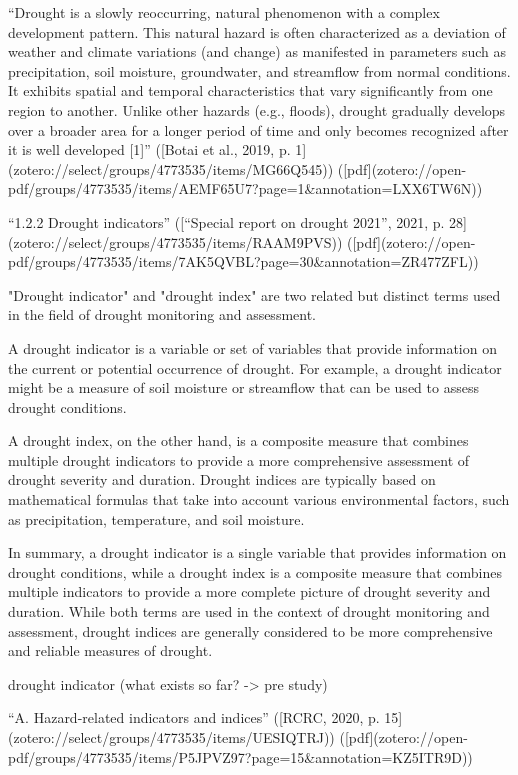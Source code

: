 {“Drought is a slowly reoccurring, natural phenomenon with a complex development pattern. This natural hazard is often characterized as a deviation of weather and climate variations (and change) as manifested in parameters such as precipitation, soil moisture, groundwater, and streamflow from normal conditions. It exhibits spatial and temporal characteristics that vary significantly from one region to another. Unlike other hazards (e.g., floods), drought gradually develops over a broader area for a longer period of time and only becomes recognized after it is well developed [1]” ([Botai et al., 2019, p. 1](zotero://select/groups/4773535/items/MG66Q545)) ([pdf](zotero://open-pdf/groups/4773535/items/AEMF65U7?page=1&annotation=LXX6TW6N))



“1.2.2 Drought indicators” ([“Special report on drought 2021”, 2021, p. 28](zotero://select/groups/4773535/items/RAAM9PVS)) ([pdf](zotero://open-pdf/groups/4773535/items/7AK5QVBL?page=30&annotation=ZR477ZFL))

"Drought indicator" and "drought index" are two related but distinct terms used in the field of drought monitoring and assessment.

A drought indicator is a variable or set of variables that provide information on the current or potential occurrence of drought. For example, a drought indicator might be a measure of soil moisture or streamflow that can be used to assess drought conditions.

A drought index, on the other hand, is a composite measure that combines multiple drought indicators to provide a more comprehensive assessment of drought severity and duration. Drought indices are typically based on mathematical formulas that take into account various environmental factors, such as precipitation, temperature, and soil moisture.

In summary, a drought indicator is a single variable that provides information on drought conditions, while a drought index is a composite measure that combines multiple indicators to provide a more complete picture of drought severity and duration. While both terms are used in the context of drought monitoring and assessment, drought indices are generally considered to be more comprehensive and reliable measures of drought.

drought indicator (what exists so far? -> pre study)

“A. Hazard-related indicators and indices” ([RCRC, 2020, p. 15](zotero://select/groups/4773535/items/UESIQTRJ)) ([pdf](zotero://open-pdf/groups/4773535/items/P5JPVZ97?page=15&annotation=KZ5ITR9D))

}
